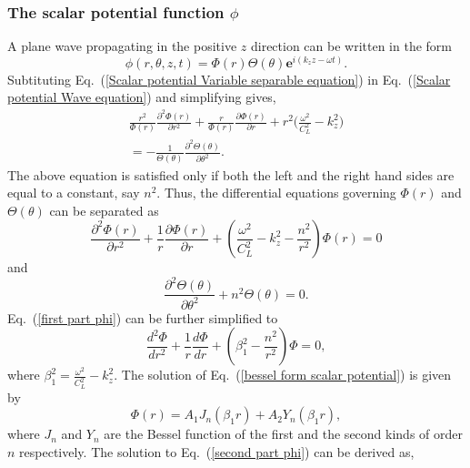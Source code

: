 \documentclass[twocolumn,10pt]{asme2ej}
\begin{document}
 \subsubsection{The scalar potential function $\phi$}
 A plane wave propagating in the positive $z$ direction can be written in the form
 \begin{equation}\label{Scalar potential Variable separable equation}
    \phi(r,\theta,z,t) = \Phi(r)\Theta(\theta)\mathbf{e}^{i(k_{z}z-\omega t)}.   
 \end{equation}
Subtituting Eq.~(\ref{Scalar potential Variable separable equation}) in  Eq.~(\ref{Scalar potential Wave equation}) and simplifying gives,
\begin{multline}
    \frac{r^{2}}{\Phi(r)}\frac{\partial^{2} \Phi(r)}{\partial r^{2}} + \frac{r}{\Phi(r)}\frac{\partial \Phi(r)}{\partial r} + r^2\bigg(\frac{\omega^{2}}{C_{L}^{2}}-k_{z}^{2}\bigg)\\ = -\frac{1}{\Theta(\theta)}\frac{\partial^{2} \Theta(\theta)}{\partial \theta^{2}}.
\end{multline}
The above equation is satisfied only if both the left and the right hand sides are equal to a constant, say $n^{2}$. Thus, the differential equations governing $\Phi(r)$ and $\Theta(\theta)$ can be separated as 
\begin{equation}\label{first part phi}
    \frac{\partial^{2} \Phi(r)}{\partial r^{2}} + \frac{1}{r}\frac{\partial \Phi(r)}{\partial r} + \left(\frac{\omega^{2}}{C_{L}^{2}}-k_{z}^{2} - \frac{n^{2}}{r^{2}}\right)\Phi(r) = 0
\end{equation}
and
\begin{equation}\label{second part phi}
    \frac{\partial^{2} \Theta(\theta)}{\partial \theta^{2}} + n^{2}\Theta(\theta) = 0.
\end{equation}
Eq.~(\ref{first part phi}) can be further simplified to 
\begin{equation}\label{bessel form scalar potential}
    \frac{d^{2}\Phi}{dr^{2}} + \frac{1}{r}\frac{d\Phi}{dr} + \left(\beta_1^{2} - \frac{n^{2}}{r^{2}}\right)\Phi = 0,
\end{equation}
where $\beta_1^{2} = \frac{\omega^{2}}{C_{L}^{2}} - k_z^{2}$. The solution of Eq.~(\ref{bessel form scalar potential}) is given by
\begin{equation}\label{Phi(R) for phi}
    \Phi(r) = A_{1}J_{n}(\beta_1 r) + A_{2}Y_{n}(\beta_1 r), 
\end{equation}
where $J_{n}$ and $Y_{n}$ are the Bessel function of the first and the second kinds of order $n$ respectively. The solution to Eq.~(\ref{second part phi}) can be derived as,
\end{document}
